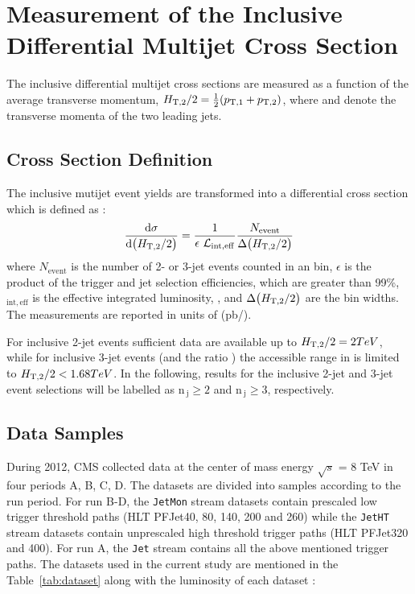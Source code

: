 \chapter{Measurement of the Inclusive Differential Multijet Cross Section}
\label{chap:measurement}
The inclusive differential multijet cross sections are measured as a
function of the average transverse momentum, $\httwo =
\frac{1}{2}(\ptone + \pttwo)$, where \ptone and \pttwo denote the
transverse momenta of the two leading jets. \\

\section{Cross Section Definition}
The inclusive mutijet event yields are transformed into a differential cross section which is defined as :
%
\begin{equation}
  \label{inclusive_formula}
  {\dd{\sigma}{\big(\httwo\big)}} = \frac{1}{\epsilon~\lumi_{\mathrm{int,eff}}}\frac{N_\mathrm{event}}{\Delta\big(\httwo\big)}
\end{equation}
%
where $N_\mathrm{event}$ is the number of 2- or 3-jet events counted in an
\httwo bin, $\epsilon$ is the product of the trigger and jet selection
efficiencies, which are greater than 99\%,
\lumins$_{\mathrm{int,eff}}$ is the effective integrated luminosity,
, and $\Delta\big(H_{\mathrm{T,2}}/2\big)$ are the bin widths. The
measurements are reported in units of (pb/\GeV).

For inclusive 2-jet events
sufficient data are available up to $H_{\mathrm{T,2}}/2 = 2{TeV}$, while for
inclusive 3-jet events (and the ratio \ratio) the accessible range in
\httwo is limited to $H_{\mathrm{T,2}}/2 < 1.68{TeV}$. In the following, results
for the inclusive 2-jet and 3-jet event selections will be labelled as
$\mathrm {n_{~j}} \geq 2$ and $\mathrm {n_{~j}} \geq 3$, respectively.

\section{Data Samples}
During 2012, CMS collected data at the center of mass energy $\sqrt{s}$ = 8 TeV in four periods A, B, C, D. The datasets are divided into 
samples according to the run period. For run B-D, the \texttt{JetMon} stream datasets contain prescaled low trigger threshold paths (HLT
PFJet40, 80, 140, 200 and 260) while the \texttt{JetHT} stream datasets contain unprescaled high threshold trigger paths (HLT PFJet320 and 
400). For run A, the \texttt{Jet} stream contains all the above mentioned trigger paths. The datasets used in the current study 
are mentioned in the Table~\ref{tab:dataset} along with the luminosity of each dataset : 

